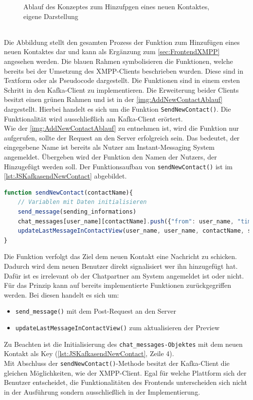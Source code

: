 \documentclass[a4paper,titlepage,halfparskip,12pt]{scrreprt}
\begin{document}
\begin{onehalfspacing}
\begin{figure}[h]
	\caption{Ablauf des Konzeptes zum Hinzufpgen eines neuen Kontaktes, eigene Darstellung}
	\label{img:AddNewContactAblauf}
\end{figure}\\
Die Abbildung stellt den gesamten Prozess der Funktion zum Hinzufügen eines neuen Kontaktes dar und kann als Ergänzung zum \autoref{sec:FrontendXMPP} angesehen werden. Die blauen Rahmen symbolisieren die Funktionen, welche bereits bei der Umsetzung des XMPP-Clients beschrieben wurden. Diese sind in Textform oder als Pseudocode dargestellt. Die Funktionen sind in einem ersten Schritt in den Kafka-Client zu implementieren. Die Erweiterung beider Clients besitzt einen grünen Rahmen und ist in der \autoref{img:AddNewContactAblauf} dargestellt. Hierbei handelt es sich um die Funktion \texttt{SendNewContact()}. Die Funktionalität wird ausschließlich am Kafka-Client erörtert.\\
Wie der \autoref{img:AddNewContactAblauf} zu entnehmen ist, wird die Funktion nur aufgerufen, sollte der Request an den Server erfolgreich sein. Das bedeutet, der eingegebene Name ist bereits als Nutzer am Instant-Messaging System angemeldet. Übergeben wird der Funktion den Namen der Nutzers, der Hinzugefügt werden soll. Der Funktionsaufbau von \texttt{sendNewContact()} ist im \autoref{lst:JSKafkasendNewContact} abgebildet.
\begin{lstlisting}[language=Javascript,caption=Funktionsaufbau von \texttt{sendNewContact()},label={lst:JSKafkasendNewContact}]
function sendNewContact(contactName){
	// Variablen mit Daten initialisieren
	send_message(sending_informations)
	chat_messages[user_name][contactName].push({"from": user_name, "timestamp": msg_timestamp, "txt": sending_informations.msg_body, "type": "chat"});
	updateLastMessageInContactView(user_name, user_name, contactName, sending_informations.msg_body)
}
\end{lstlisting}
Die Funktion verfolgt das Ziel dem neuen Kontakt eine Nachricht zu schicken. Dadurch wird dem neuen Benutzer direkt signalisiert wer ihn hinzugefügt hat. Dafür ist es irrelevant ob der Chatpartner am System angemeldet ist oder nicht. Für das Prinzip kann auf bereits implementierte Funktionen zurückgegriffen werden. Bei diesen handelt es sich um:
\begin{itemize}
	\item \texttt{send\_message()} mit dem Post-Request an den Server
	\item \texttt{updateLastMessageInContactView()} zum aktualisieren der Preview
\end{itemize}
Zu Beachten ist die Initialisierung des \texttt{chat\_messages-Objektes} mit dem neuen Kontakt als Key (\autoref{lst:JSKafkasendNewContact}, Zeile 4).\\
Mit Abschluss der \texttt{sendNewContact()}-Methode besitzt der Kafka-Client die gleichen Möglichkeiten, wie der XMPP-Client. Egal für welche Plattform sich der Benutzer entscheidet, die Funktionalitäten des Frontends unterscheiden sich nicht in der Ausführung sondern ausschließlich in der Implementierung.


\end{onehalfspacing}
\end{document}
